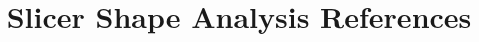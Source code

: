 \documentclass[a4paper]{article}
\title{Slicer Shape Analysis References}
\begin{document}
\maketitle
\nocite{*}

\end{document}
